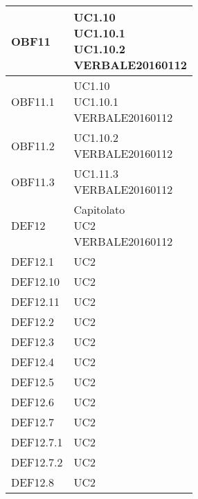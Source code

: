 \documentclass{scalatekids-article}
\begin{document}
\begin{longtable}[H]{|p{5.5cm}|p{5.5cm}|}
  \hline
  OBF11 & \multiLineCell[t]{UC1.10\\UC1.10.1\\UC1.10.2\\VERBALE20160112\\}\\
  \hline
  OBF11.1 & \multiLineCell[t]{UC1.10\\UC1.10.1\\VERBALE20160112\\}\\
  \hline
  OBF11.2 & \multiLineCell[t]{UC1.10.2\\VERBALE20160112\\}\\
  \hline
  OBF11.3 & \multiLineCell[t]{UC1.11.3\\VERBALE20160112\\}\\
  \hline
  DEF12 & \multiLineCell[t]{Capitolato\\UC2\\VERBALE20160112\\}\\
  \hline
  DEF12.1 & \multiLineCell[t]{UC2\\}\\
  \hline
  DEF12.10 & \multiLineCell[t]{UC2\\}\\
  \hline
  DEF12.11 & \multiLineCell[t]{UC2\\}\\
  \hline
  DEF12.2 & \multiLineCell[t]{UC2\\}\\
  \hline
  DEF12.3 & \multiLineCell[t]{UC2\\}\\
  \hline
  DEF12.4 & \multiLineCell[t]{UC2\\}\\
  \hline
  DEF12.5 & \multiLineCell[t]{UC2\\}\\
  \hline
  DEF12.6 & \multiLineCell[t]{UC2\\}\\
  \hline
  DEF12.7 & \multiLineCell[t]{UC2\\}\\
  \hline
  DEF12.7.1 & \multiLineCell[t]{UC2\\}\\
  \hline
  DEF12.7.2 & \multiLineCell[t]{UC2\\}\\
  \hline
  DEF12.8 & \multiLineCell[t]{UC2\\}\\

\end{longtable}
\end{document}
